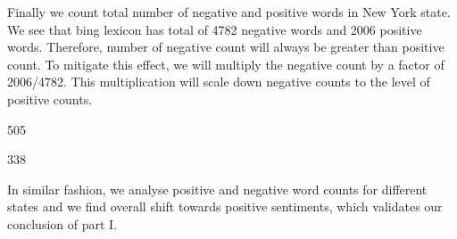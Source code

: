 \documentclass[a4paper,12pt]{book}
\theoremstyle{break}
\begin{document}
Finally we count total number of negative and positive words in New York state. We see that bing lexicon has total of 4782 negative words and 2006 positive words. Therefore, number of negative count will always be greater than positive count. To mitigate this effect, we will multiply the negative count by a factor of 2006/4782. This multiplication will scale down negative counts to the level of positive counts.

\begin{Schunk}
\begin{Soutput}
[1] 505
\end{Soutput}
\begin{Soutput}
[1] 338
\end{Soutput}
\end{Schunk}


In similar fashion, we analyse positive and negative word counts for different states and we find overall shift towards positive sentiments, which validates our conclusion of part I.
\end{document}
